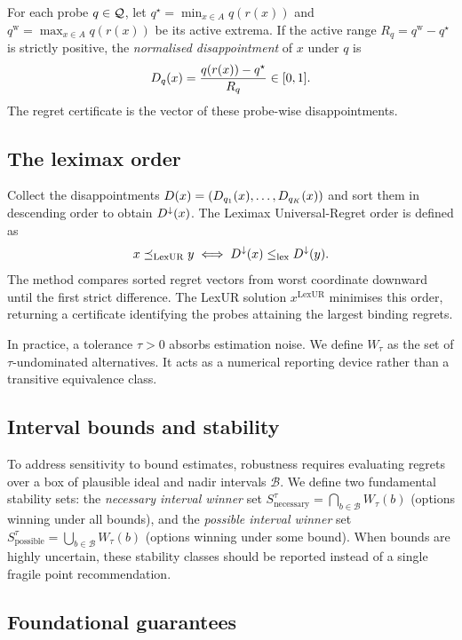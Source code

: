 For each probe $q\in\mathcal{Q}$, let $q^\star=\min_{x\in A}q(r(x))$ and $q^{\mathrm w}=\max_{x\in A}q(r(x))$ be its active extrema. If the active range $R_q = q^{\mathrm w} - q^\star$ is strictly positive, the \emph{normalised disappointment} of $x$ under $q$ is
\begin{equation}
D_q(x)=\frac{q(r(x))-q^\star}{R_q}\in[0,1].
\label{eq:disap}
\end{equation}
The regret certificate is the vector of these probe-wise disappointments. 

\subsection{The leximax order}
Collect the disappointments $D(x)=(D_{q_1}(x),\dots,D_{q_K}(x))$ and sort them in descending order to obtain $D^{\downarrow}(x)$. The Leximax Universal-Regret order is defined as
\begin{equation}
x\preceq_{\mathrm{LexUR}}y \iff D^{\downarrow}(x)\leq_{\mathrm{lex}} D^{\downarrow}(y).
\label{eq:lexur}
\end{equation}
The method compares sorted regret vectors from worst coordinate downward until the first strict difference. The LexUR solution $x^{\mathrm{LexUR}}$ minimises this order, returning a certificate identifying the probes attaining the largest binding regrets.



In practice, a tolerance $\tau>0$ absorbs estimation noise. We define $W_\tau$ as the set of $\tau$-undominated alternatives. It acts as a numerical reporting device rather than a transitive equivalence class.

\subsection{Interval bounds and stability}
To address sensitivity to bound estimates, robustness requires evaluating regrets over a box of plausible ideal and nadir intervals $\mathcal B$. We define two fundamental stability sets: the \emph{necessary interval winner} set $S_{\text{necessary}}^\tau=\bigcap_{b\in\mathcal B} W_\tau(b)$ (options winning under all bounds), and the \emph{possible interval winner} set $S_{\text{possible}}^\tau=\bigcup_{b\in\mathcal B} W_\tau(b)$ (options winning under some bound). When bounds are highly uncertain, these stability classes should be reported instead of a single fragile point recommendation.

\subsection{Foundational guarantees}

